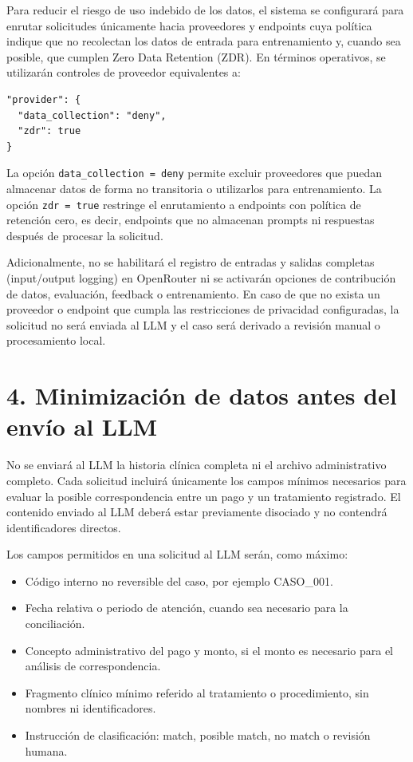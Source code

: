 \documentclass[12pt,a4paper]{article}
\begin{document}
Para reducir el riesgo de uso indebido de los datos, el sistema se configurará para enrutar solicitudes únicamente hacia proveedores y endpoints cuya política indique que no recolectan los datos de entrada para entrenamiento y, cuando sea posible, que cumplen Zero Data Retention (ZDR). En términos operativos, se utilizarán controles de proveedor equivalentes a:

\begin{lstlisting}
"provider": {
  "data_collection": "deny",
  "zdr": true
}
\end{lstlisting}

La opción \texttt{data\_collection = deny} permite excluir proveedores que puedan almacenar datos de forma no transitoria o utilizarlos para entrenamiento. La opción \texttt{zdr = true} restringe el enrutamiento a endpoints con política de retención cero, es decir, endpoints que no almacenan prompts ni respuestas después de procesar la solicitud.

Adicionalmente, no se habilitará el registro de entradas y salidas completas (input/output logging) en OpenRouter ni se activarán opciones de contribución de datos, evaluación, feedback o entrenamiento. En caso de que no exista un proveedor o endpoint que cumpla las restricciones de privacidad configuradas, la solicitud no será enviada al LLM y el caso será derivado a revisión manual o procesamiento local.

\section*{4. Minimización de datos antes del envío al LLM}
No se enviará al LLM la historia clínica completa ni el archivo administrativo completo. Cada solicitud incluirá únicamente los campos mínimos necesarios para evaluar la posible correspondencia entre un pago y un tratamiento registrado. El contenido enviado al LLM deberá estar previamente disociado y no contendrá identificadores directos.

Los campos permitidos en una solicitud al LLM serán, como máximo:
\begin{itemize}
    \item Código interno no reversible del caso, por ejemplo CASO\_001.
    \item Fecha relativa o periodo de atención, cuando sea necesario para la conciliación.
    \item Concepto administrativo del pago y monto, si el monto es necesario para el análisis de correspondencia.
    \item Fragmento clínico mínimo referido al tratamiento o procedimiento, sin nombres ni identificadores.
    \item Instrucción de clasificación: match, posible match, no match o revisión humana.
\end{itemize}
\end{document}
